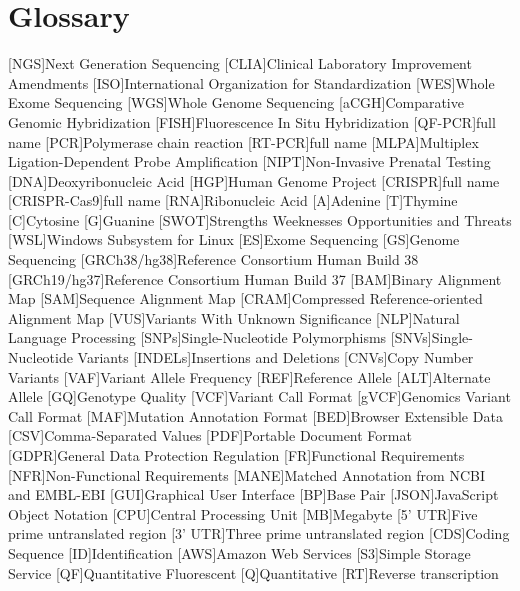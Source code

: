 \chapter{Glossary}

\footnotesize
\SingleSpacing

\begin{multicols}{2}
\begin{acronym}[AAAAAA]

	[NGS]{Next Generation Sequencing}
	[CLIA]{Clinical Laboratory Improvement Amendments}
	[ISO]{International Organization for Standardization}
	[WES]{Whole Exome Sequencing}
	[WGS]{Whole Genome Sequencing}
	[aCGH]{Comparative Genomic Hybridization}
	[FISH]{Fluorescence In Situ Hybridization}
	[QF-PCR]{full name}
	[PCR]{Polymerase chain reaction}
	[RT-PCR]{full name}
	[MLPA]{Multiplex Ligation-Dependent Probe Amplification}
	[NIPT]{Non-Invasive Prenatal Testing}
	[DNA]{Deoxyribonucleic Acid}
	[HGP]{Human Genome Project}
	[CRISPR]{full name}
	[CRISPR-Cas9]{full name}
	[RNA]{Ribonucleic Acid}
	{Adenine}
	{Thymine}
	{Cytosine}
	{Guanine}
	[SWOT]{Strengths Weeknesses Opportunities and Threats}
	[WSL]{Windows Subsystem for Linux}
	[ES]{Exome Sequencing}
	[GS]{Genome Sequencing}
	[GRCh38/hg38]{Reference Consortium Human Build 38}
	[GRCh19/hg37]{Reference Consortium Human Build 37}
	[BAM]{Binary Alignment Map}
	[SAM]{Sequence Alignment Map}
	[CRAM]{Compressed Reference-oriented Alignment Map}
	[VUS]{Variants With Unknown Significance}
	[NLP]{Natural Language Processing}
	[SNPs]{Single-Nucleotide Polymorphisms}
	[SNVs]{Single-Nucleotide Variants}
	[INDELs]{Insertions and Deletions}
	[CNVs]{Copy Number Variants}
	[VAF]{Variant Allele Frequency}
	[REF]{Reference Allele}
	[ALT]{Alternate Allele}
	[GQ]{Genotype Quality}
	[VCF]{Variant Call Format}
	[gVCF]{Genomics Variant Call Format}
	[MAF]{Mutation Annotation Format}
	[BED]{Browser Extensible Data}
	[CSV]{Comma-Separated Values}
	[PDF]{Portable Document Format}
	[GDPR]{General Data Protection Regulation}
	[FR]{Functional Requirements}
	[NFR]{Non-Functional Requirements}
	[MANE]{Matched Annotation from NCBI and EMBL-EBI}
	[GUI]{Graphical User Interface}
	[BP]{Base Pair}
	[JSON]{JavaScript Object Notation}
	[CPU]{Central Processing Unit}
	[MB]{Megabyte}
	[5' UTR]{Five prime untranslated region}
	[3' UTR]{Three prime untranslated region}
	[CDS]{Coding Sequence}
	[ID]{Identification}
	[AWS]{Amazon Web Services}
	[S3]{Simple Storage Service}
	[QF]{Quantitative Fluorescent}
	{Quantitative}
	[RT]{Reverse transcription}


\end{acronym}
\end{multicols}

